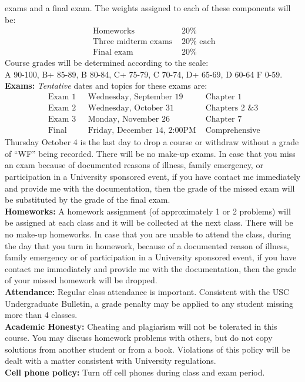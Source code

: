 \documentclass[12pt]{amsart}
\begin{document}
exams and a final exam. The weights assigned to each of these components will be:
\[
\begin{array} {ll}
\mbox{ Homeworks } & 20 \% \\
\mbox{ Three midterm exams } & 20 \% \mbox{ each} \\
\mbox{ Final exam } & 20 \%
\end{array}
\]
Course grades will be determined according to the scale:\\
A 90-100, B+ 85-89, B 80-84, C+ 75-79, C 70-74, D+ 65-69, D 60-64 F 0-59.\\[0.3cm]
{\bf Exams:} {\em Tentative} dates and topics for these exams are:
\[
\begin{array}{lll}
\mbox{ Exam 1 } & \mbox{ Wednesday, September 19} & \mbox{ Chapter } 1 \\
\mbox{ Exam 2 } & \mbox{ Wednesday, October 31} & \mbox{ Chapters 2 \& 3}\\
\mbox{ Exam 3 } & \mbox{ Monday, November 26} & \mbox{ Chapter } 7\\
\mbox{ Final} & \mbox{ Friday, December 14, 2:00PM}  & \mbox{ Comprehensive}
\end{array}
\]
Thursday October 4 is the last day to drop a course or withdraw without a grade of ``WF'' being recorded.
There will be no make-up exams. In case that you miss an exam because of  documented reasons of illness, family
emergency, or participation in a University sponsored event, if you have contact me immediately and provide me 
with the documentation, then the grade of the missed exam will be substituted by the grade of the final 
exam.\\[0.3cm]
{\bf Homeworks:} A homework assignment (of approximately 1 or 2
problems) will be assigned at each class and it will be collected at the next class. 
There will be  no make-up homeworks. In case that you are unable to attend the class,
during the day that you turn in homework, because of a documented
reason of illness, family emergency or of participation in a University
sponsored event, if you have contact me immediately and provide me with the
documentation, then the grade of your missed homework will be dropped.\\[0.3cm]
{\bf Attendance:} Regular class attendance is important. Consistent
with the USC Undergraduate Bulletin, a grade penalty may be applied to
any student missing more than 4 classes.\\[0.3cm]
{\bf Academic Honesty:} Cheating and plagiarism will not be tolerated
in this course. You may discuss homework problems with others, but do
not copy solutions from another student or from a book. Violations of
this policy will be dealt with a matter consistent with University
regulations. \\[0.3cm]
{\bf Cell phone policy:} Turn off cell phones during class and exam period.
\end{document}
